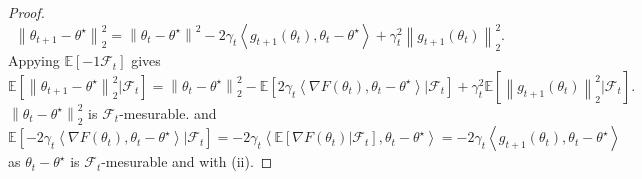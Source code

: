 \begin{proof}
    \[
        \left\| \theta _{t+1} - \theta ^{\star } \right\|^2_2 = \left\| \theta _{t} - \theta ^{\star } \right\|^2 - 2 \gamma _t \left\langle g_{t+1 }(\theta _t), \theta _t - \theta ^\star  \right\rangle + \gamma _t ^2 \left\| g_{t+1}(\theta _t) \right\| _2 ^2
    .\]
    Appying $ \mathbb{E}[ -1 \mathcal{F}_t] $ gives 
    \[
        \mathbb{E}[\left\| \theta _{t+1} - \theta ^\star  \right\| _2 ^2 | \mathcal{F}_t] = \left\| \theta _t - \theta ^\star  \right\| _2 ^2 - \mathbb{E}[2 \gamma _t \left\langle \nabla F(\theta _t), \theta _t - \theta ^\star  \right\rangle | \mathcal{F}_t] + \gamma _t ^2 \mathbb{E}[ \left\| g_{t+1} (\theta _t) \right\| _2 ^2 | \mathcal{F}_t]
    .\]
    $\left\| \theta _t - \theta ^\star  \right\| _2 ^2$ is $\mathcal{F}_t$-mesurable. and $\mathbb{E}[-2 \gamma _t \left\langle \nabla F(\theta _t), \theta _t - \theta ^\star  \right\rangle | \mathcal{F}_t] = -2 \gamma _t \left\langle \mathbb{E}[\nabla F(\theta _t)| \mathcal{F}_t], \theta _t - \theta ^\star  \right\rangle  = -2 \gamma _t \left\langle g_{t+1 }(\theta _t), \theta _t - \theta ^\star  \right\rangle  $ as $\theta _t - \theta ^\star  $ is $\mathcal{F}_t$-mesurable and with (ii).
    

\end{proof}
